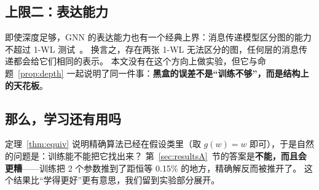 \subsection{上限二：表达能力}

即使深度足够，GNN 的表达能力也有一个经典上界：消息传递模型区分图的能力不超过 1-WL 测试~\cite{xu2019gin}。
换言之，存在两张 1-WL 无法区分的图，任何层的消息传递都会给它们相同的表示。
本文没有在这个方向上做实验，但它与命题~\ref{prop:depth} 一起说明了同一件事：\textbf{黑盒的误差不是“训练不够”，而是结构上的天花板}。

\subsection{那么，学习还有用吗}

定理~\ref{thm:equiv} 说明精确算法已经在假设类里（取 $g(w)=w$ 即可），于是自然的问题是：训练能不能把它找出来？
第~\ref{sec:resultsA}~节的答案是\textbf{不能，而且会更糟}——训练把 2 个参数推到了距恒等 0.15\% 的地方，精确解反而被推开了。
这个结果比“学得更好”更有意思，我们留到实验部分展开。

